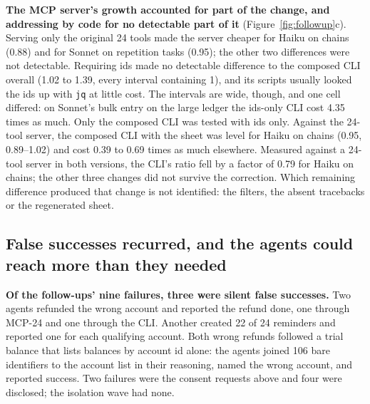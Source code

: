 \documentclass[sigconf,nonacm]{acmart}
\newcommand{\cfg}[1]{\textsf{#1}}
\newcommand{\finding}[1]{\textbf{#1}}
\begin{document}
\finding{The MCP server's growth accounted for part of the change, and addressing by code for no detectable part of it} (Figure~\ref{fig:followup}c). Serving only the original 24 tools made the server cheaper for Haiku on chains (0.88) and for Sonnet on repetition tasks (0.95); the other two differences were not detectable. Requiring ids made no detectable difference to the composed CLI overall (1.02 to 1.39, every interval containing 1), and its scripts usually looked the ids up with \texttt{jq} at little cost. The intervals are wide, though, and one cell differed: on Sonnet's bulk entry on the large ledger the ids-only CLI cost 4.35 times as much. Only the composed CLI was tested with ids only. Against the 24-tool server, the composed CLI with the sheet was level for Haiku on chains (0.95, 0.89--1.02) and cost 0.39 to 0.69 times as much elsewhere. Measured against a 24-tool server in both versions, the CLI's ratio fell by a factor of 0.79 for Haiku on chains; the other three changes did not survive the correction. Which remaining difference produced that change is not identified: the filters, the absent tracebacks or the regenerated sheet.

\subsection{False successes recurred, and the agents could reach more than they needed}
\label{sec:followup-oversight}
\finding{Of the follow-ups' nine failures, three were silent false successes.} Two agents refunded the wrong account and reported the refund done, one through \cfg{MCP-24} and one through the CLI. Another created 22 of 24 reminders and reported one for each qualifying account. Both wrong refunds followed a trial balance that lists balances by account id alone: the agents joined 106 bare identifiers to the account list in their reasoning, named the wrong account, and reported success. Two failures were the consent requests above and four were disclosed; the isolation wave had none.
\end{document}
